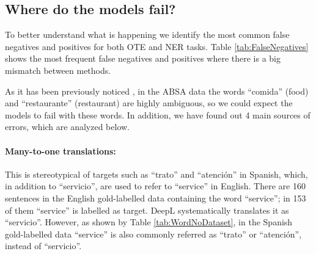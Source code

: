 \documentclass[11pt]{article}
\begin{document}
\begin{table}[htbp]
  \centering
  \small
  \caption{OTE F1 score of different XLM-R large models trained using data generated with different translation systems.}
  \label{char:translators}
\end{table}













\subsection{Where do the models fail?}

To better understand what is happening we identify the most common false negatives and positives for both OTE and NER tasks. Table \ref{tab:FalseNegatives} shows the most frequent false negatives and positives where there is a big mismatch between methods.

As it has been previously noticed \cite{AGERRI201985}, in the ABSA data the words ``comida'' (food) and ``restaurante'' (restaurant) are highly ambiguous, so we could expect the models to fail with these words. In addition, we have found out 4 main sources of errors, which are analyzed below.

\paragraph{Many-to-one translations:} This is stereotypical of targets such as ``trato'' and ``atención'' in Spanish, which, in addition to ``servicio'', are used to refer to ``service'' in English. There are 160 sentences in the English gold-labelled data containing the word ``service''; in 153 of them ``service'' is labelled as target. DeepL systematically translates it as ``servicio''. However, as shown by Table \ref{tab:WordNoDataset}, in the Spanish gold-labelled data ``service'' is also commonly referred as ``trato'' or ``atención'', instead of ``servicio''.
\end{document}
